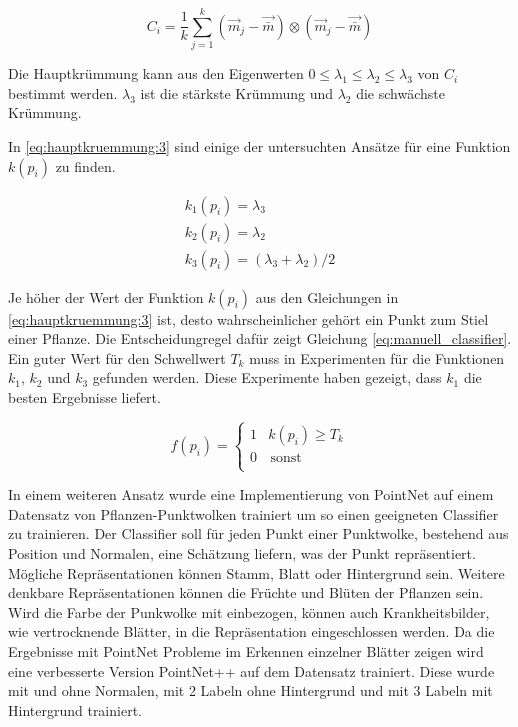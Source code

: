 \documentclass[12pt,titlepage, twoside]{article}
\begin{document}
\begin{equation}
\label{eq:hauptkruemmung:2}
C_i = \frac{1}{k} \sum_{j=1}^k{(\vec{m}_j - \vec{\bar{m}}) \otimes (\vec{m}_j - \vec{\bar{m}})}
\end{equation}

Die Hauptkrümmung kann aus den Eigenwerten $0 \leq \lambda_1 \leq \lambda_2 \leq \lambda_3$ von $C_i$ bestimmt werden. $\lambda_3$ ist die stärkste Krümmung und $\lambda_2$ die schwächste Krümmung.

In \ref{eq:hauptkruemmung:3} sind einige der untersuchten Ansätze für eine Funktion $k(p_i)$ zu finden. 

\begin{equation}
\label{eq:hauptkruemmung:3}
\begin{array}{ll}
k_1(p_i) = \lambda_3 \\
k_2(p_i) = \lambda_2 \\
k_3(p_i) = (\lambda_3 + \lambda_2) / 2 
\end{array}{}
\end{equation}

Je höher der Wert der Funktion $k(p_i)$ aus den Gleichungen in \ref{eq:hauptkruemmung:3} ist, desto wahrscheinlicher gehört ein Punkt zum Stiel einer Pflanze. 
Die Entscheidungregel dafür zeigt Gleichung \ref{eq:manuell_classifier}.
Ein guter Wert für den Schwellwert $T_k$ muss in Experimenten für die Funktionen $k_1$, $k_2$ und $k_3$ gefunden werden. 
Diese Experimente haben gezeigt, dass $k_1$ die besten Ergebnisse liefert.

\begin{equation}
\label{eq:manuell_classifier}
f(p_i) = \left\{
\begin{array}{ll}
1 & k(p_i) \geq T_k \\
0 & \, \textrm{sonst} \\
\end{array}
\right. 
\end{equation}

In einem weiteren Ansatz wurde eine Implementierung von PointNet auf einem Datensatz von Pflanzen-Punktwolken trainiert um so einen geeigneten Classifier zu trainieren.
Der Classifier soll für jeden Punkt einer Punktwolke, bestehend aus Position und Normalen, eine Schätzung liefern, was der Punkt repräsentiert. 
Mögliche Repräsentationen können Stamm, Blatt oder Hintergrund sein.
Weitere denkbare Repräsentationen können die Früchte und Blüten der Pflanzen sein. 
Wird die Farbe der Punkwolke mit einbezogen, können auch Krankheitsbilder, wie vertrocknende Blätter, in die Repräsentation eingeschlossen werden.  
Da die Ergebnisse mit PointNet Probleme im Erkennen einzelner Blätter zeigen wird eine verbesserte Version PointNet++ auf dem Datensatz trainiert. 
Diese wurde mit und ohne Normalen, mit 2 Labeln ohne Hintergrund und mit 3 Labeln mit Hintergrund trainiert.
\end{document}
